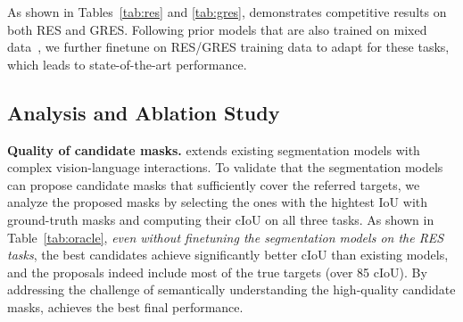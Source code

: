 As shown in Tables~\ref{tab:res} and \ref{tab:gres}, \ourmodel demonstrates competitive results on both RES and GRES. Following prior models that are also trained on mixed data~\cite{lai2024lisa, rasheed2024glamm, xia2024gsva}, we further finetune \ourmodel on RES/GRES training data to adapt \ourmodel for these tasks, which leads to state-of-the-art performance.

\subsection{Analysis and Ablation Study}
\label{sec:expr-ablation}
\noindent\textbf{Quality of candidate masks.} \ourmodel extends existing segmentation models with complex vision-language interactions. To validate that the segmentation models can propose candidate masks that sufficiently cover the referred targets, we analyze the proposed masks by selecting the ones with the hightest IoU with ground-truth masks and computing their cIoU on all three tasks. As shown in Table~\ref{tab:oracle}, \emph{even without finetuning the segmentation models on the RES tasks}, the best candidates achieve significantly better cIoU than existing models, and the proposals indeed include most of the true targets (over 85 cIoU). By addressing the challenge of semantically understanding the high-quality candidate masks, \ourmodel achieves the best final performance.

